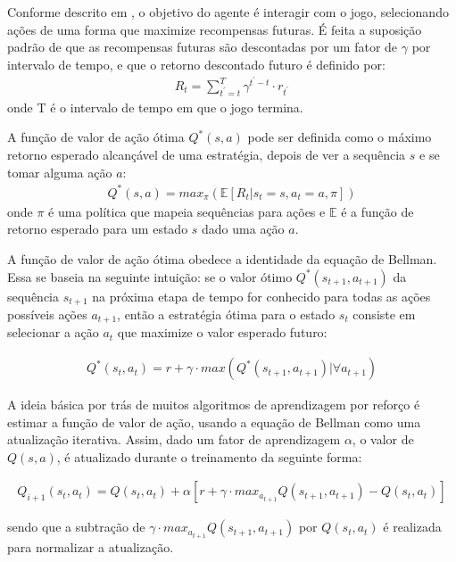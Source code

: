 Conforme descrito em \cite{play-atari-drl-deepmind}, o objetivo do agente é interagir com o jogo, selecionando ações de uma forma que maximize recompensas futuras. É feita a suposição padrão de que as recompensas futuras são descontadas por um fator de $\gamma$ por intervalo de tempo, e que o retorno descontado futuro é definido por: 
\begin{eqnarray}
	R_t=\sum_{t^{\prime}=t}^T \gamma^{t^{\prime}-t}\cdot r_{t^{\prime}}
\end{eqnarray}
onde T é o intervalo de tempo em que o jogo termina. 

A função de valor de ação ótima $Q^{*}(s, a)$ pode ser definida como o máximo retorno esperado alcançável de uma estratégia, depois de ver a sequência $s$ e se tomar alguma ação $a$:
\begin{eqnarray}
	Q^{*}(s, a)=max_\pi(\mathbb{E}[R_t | s_t=s,a_t=a,\pi])
\end{eqnarray}
onde $\pi$ é uma política que mapeia sequências para ações e $\mathbb{E}$ é a função de retorno esperado para um estado $s$ dado uma ação $a$.

A função de valor de ação ótima obedece a identidade da equação de Bellman. Essa se baseia na seguinte intuição: se o valor ótimo $Q^{*}(s_{t+1}, a_{t+1})$ da sequência $s_{t+1}$ na próxima etapa de tempo for conhecido para todas as ações possíveis ações $a_{t+1}$, então a estratégia ótima para o estado $s_t$ consiste em selecionar a ação $a_{t}$ que maximize o valor esperado futuro:

\begin{eqnarray}
	Q^{*}(s_t, a_t)= r + \gamma \cdot max(Q^{*}(s_{t+1},a_{t+1})|\forall a_{t+1})
\end{eqnarray}

A ideia básica por trás de muitos algoritmos de aprendizagem por reforço é estimar a função de valor de ação, usando a equação de Bellman como uma atualização iterativa. Assim, dado um fator de aprendizagem $\alpha$, o valor de $Q(s,a)$, é atualizado durante o treinamento da seguinte forma:

\begin{eqnarray}
  Q_{i+1}(s_t,a_t) = Q(s_t,a_t) + \alpha[r + \gamma\cdot max_{a_{t+1}}Q(s_{t+1},a_{t+1}) - Q(s_t,a_t)]
  \label{eq:qlearning}
\end{eqnarray}

sendo que a subtração de $\gamma\cdot max_{a_{t+1}}Q(s_{t+1},a_{t+1})$ por $Q(s_t,a_t)$ é realizada para normalizar a atualização. 

